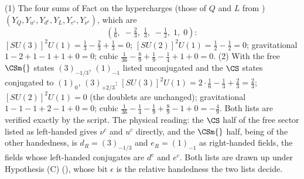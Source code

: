 (1) The four sums of Fact  on the hypercharges (those of $Q$ and $L$ from ) $(Y_{Q}, Y_{u^{c}}, Y_{d^{c}}, Y_{L}, Y_{e^{c}}, Y_{\nu^{c}})$, which are
\[
(\tfrac16,\; -\tfrac23,\; \tfrac13,\; -\tfrac12,\; 1,\; 0):
\] $[SU(3)]^{2}U(1) = \tfrac13 - \tfrac23 + \tfrac13 = 0$; $[SU(2)]^{2}U(1) = \tfrac12 - \tfrac12 = 0$; gravitational $1 - 2 + 1 - 1 + 1 + 0 = 0$; cubic $\tfrac{1}{36} - \tfrac89 + \tfrac19 - \tfrac14 + 1 + 0 = 0$. (2) With the free $\CSm{}$ states $(3)_{-1/3}$, $(1)_{-1}$ listed unconjugated and the $\CS$ states conjugated to $(1)_{0}$, $(3)_{+2/3}$: $[SU(3)]^{2}U(1) = 2 \cdot \tfrac16 - \tfrac13 + \tfrac23 = \tfrac23$; $[SU(2)]^{2}U(1) = 0$ (the doublets are unchanged); gravitational $1 - 1 - 1 + 2 - 1 + 0 = 0$; cubic $\tfrac{1}{36} - \tfrac14 - \tfrac19 + \tfrac89 - 1 + 0 = -\tfrac49$. Both lists are verified exactly by the script. The physical reading: the $\CS$ half of the free sector listed as left-handed gives $\nu^{c}$ and $u^{c}$ directly, and the $\CSm{}$ half, being of the other handedness, is $d_{R} = (3)_{-1/3}$ and $e_{R} = (1)_{-1}$ as right-handed fields, the fields whose left-handed conjugates are $d^{c}$ and $e^{c}$. Both lists are drawn up under Hypothesis (C) (), whose bit $\epsilon$ is the relative handedness the two lists decide.
